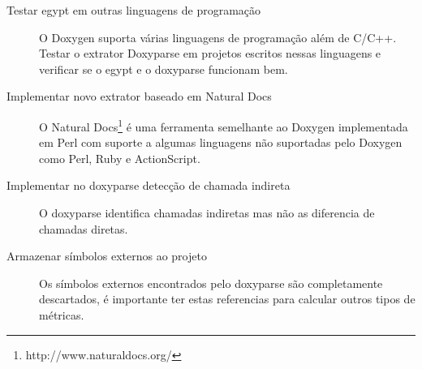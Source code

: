 \begin{description}

\item[Testar egypt em outras linguagens de programação]
O Doxygen suporta várias linguagens de programação além de C/C++. Testar o
extrator Doxyparse em projetos escritos nessas linguagens e verificar se o
egypt e o doxyparse funcionam bem.

\item[Implementar novo extrator baseado em Natural Docs]
O Natural Docs\footnote{http://www.naturaldocs.org/} é uma ferramenta
semelhante ao Doxygen implementada em Perl com suporte a algumas linguagens não
suportadas pelo Doxygen como Perl, Ruby e ActionScript.

\item[Implementar no doxyparse detecção de chamada indireta]
O doxyparse identifica chamadas indiretas mas não as diferencia de chamadas
diretas.

\item[Armazenar símbolos externos ao projeto]
Os símbolos externos encontrados pelo doxyparse são completamente descartados,
é importante ter estas referencias para calcular outros tipos de métricas.

\end{description}
